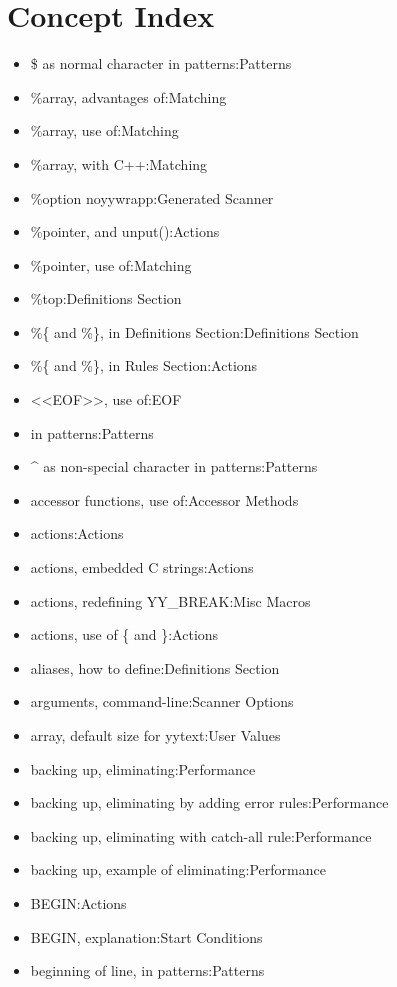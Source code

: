 \documentclass[openany,oneside]{book}
\begin{document}
\section{Concept Index}

\begin{itemize}
\item \${} as normal character in patterns:Patterns
\item \%{}array, advantages of:Matching
\item \%{}array, use of:Matching
\item \%{}array, with C++:Matching
\item \%{}option noyywrapp:Generated Scanner
\item \%{}pointer, and unput():Actions
\item \%{}pointer, use of:Matching
\item \%{}top:Definitions Section
\item \%{}\{{} and \%{}\}{}, in Definitions Section:Definitions Section
\item \%{}\{{} and \%{}\}{}, in Rules Section:Actions
\item <<EOF>>, use of:EOF
\item [] in patterns:Patterns
\item \^{} as non-special character in patterns:Patterns
\item accessor functions, use of:Accessor Methods
\item actions:Actions
\item actions, embedded C strings:Actions
\item actions, redefining YY\_{}BREAK:Misc Macros
\item actions, use of \{{} and \}{}:Actions
\item aliases, how to define:Definitions Section
\item arguments, command-line:Scanner Options
\item array, default size for yytext:User Values
\item backing up, eliminating:Performance
\item backing up, eliminating by adding error rules:Performance
\item backing up, eliminating with catch-all rule:Performance
\item backing up, example of eliminating:Performance
\item BEGIN:Actions
\item BEGIN, explanation:Start Conditions
\item beginning of line, in patterns:Patterns

\end{itemize}
\end{document}
